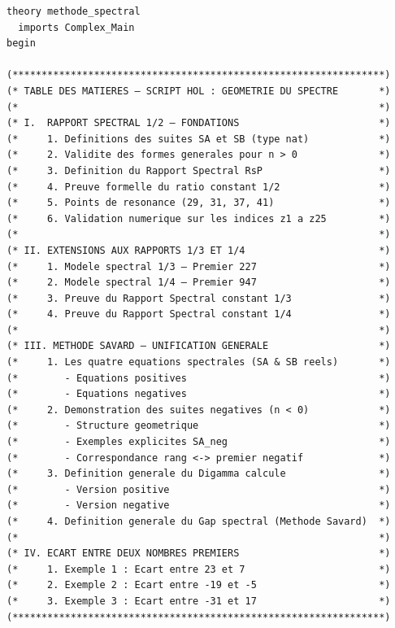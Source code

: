 \documentclass[a4paper,11pt]{article}
\begin{document}
\begin{holcode}[title={\textcolor{white}{Fichier : methode\_spectral.thy -- Partie 1/4}}]
\begin{lstlisting}
theory methode_spectral
  imports Complex_Main
begin

(****************************************************************)
(* TABLE DES MATIERES – SCRIPT HOL : GEOMETRIE DU SPECTRE       *)
(*                                                              *)
(* I.  RAPPORT SPECTRAL 1/2 – FONDATIONS                        *)
(*     1. Definitions des suites SA et SB (type nat)            *)
(*     2. Validite des formes generales pour n > 0              *)
(*     3. Definition du Rapport Spectral RsP                    *)
(*     4. Preuve formelle du ratio constant 1/2                 *)
(*     5. Points de resonance (29, 31, 37, 41)                  *)
(*     6. Validation numerique sur les indices z1 a z25         *)
(*                                                              *)
(* II. EXTENSIONS AUX RAPPORTS 1/3 ET 1/4                       *)
(*     1. Modele spectral 1/3 – Premier 227                     *)
(*     2. Modele spectral 1/4 – Premier 947                     *)
(*     3. Preuve du Rapport Spectral constant 1/3               *)
(*     4. Preuve du Rapport Spectral constant 1/4               *)
(*                                                              *)
(* III. METHODE SAVARD – UNIFICATION GENERALE                   *)
(*     1. Les quatre equations spectrales (SA & SB reels)       *)
(*        - Equations positives                                 *)
(*        - Equations negatives                                 *)
(*     2. Demonstration des suites negatives (n < 0)            *)
(*        - Structure geometrique                               *)
(*        - Exemples explicites SA_neg                          *)
(*        - Correspondance rang <-> premier negatif             *)
(*     3. Definition generale du Digamma calcule                *)
(*        - Version positive                                    *)
(*        - Version negative                                    *)
(*     4. Definition generale du Gap spectral (Methode Savard)  *)
(*                                                              *)
(* IV. ECART ENTRE DEUX NOMBRES PREMIERS                        *)
(*     1. Exemple 1 : Ecart entre 23 et 7                       *)
(*     2. Exemple 2 : Ecart entre -19 et -5                     *)
(*     3. Exemple 3 : Ecart entre -31 et 17                     *)
(****************************************************************)


\end{lstlisting}
\end{holcode}
\end{document}
